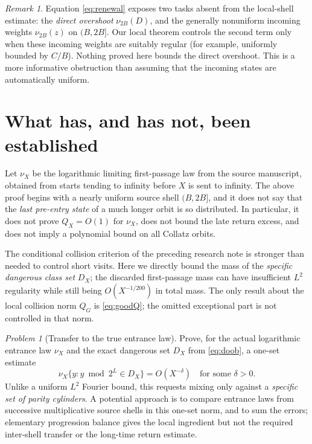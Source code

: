 \documentclass[11pt]{amsart}
\theoremstyle{remark}\newtheorem{remark}{Remark}
\newtheorem{problem}{Problem}
\begin{document}
\begin{remark}
Equation \eqref{eq:renewal} exposes two tasks absent from the local-shell estimate: the \emph{direct overshoot} $\nu_{2B}(D)$, and the generally nonuniform incoming weights $\nu_{2B}(z)$ on $(B,2B]$.  Our local theorem controls the second term only when these incoming weights are suitably regular (for example, uniformly bounded by $C/B$).  Nothing proved here bounds the direct overshoot.  This is a more informative obstruction than assuming that the incoming states are automatically uniform.
\end{remark}

\section{What has, and has not, been established}
Let $\nu_X$ be the logarithmic limiting first-passage law from the source manuscript, obtained from starts tending to infinity before $X$ is sent to infinity.  The above proof begins with a nearly uniform source shell $(B,2B]$, and it does not say that the \emph{last pre-entry state} of a much longer orbit is so distributed.  In particular, it does not prove $Q_X=O(1)$ for $\nu_X$, does not bound the late return excess, and does not imply a polynomial bound on all Collatz orbits.

The conditional collision criterion of the preceding research note is stronger than needed to control short visits.  Here we directly bound the mass of the \emph{specific dangerous class set} $D_X$; the discarded first-passage mass can have insufficient $L^2$ regularity while still being $O(X^{-1/200})$ in total mass.  The only result about the local collision norm $Q_G$ is \eqref{eq:goodQ}; the omitted exceptional part is not controlled in that norm.

\begin{problem}[Transfer to the true entrance law]
Prove, for the actual logarithmic entrance law $\nu_X$ and the exact dangerous set $D_X$ from \eqref{eq:doob}, a one-set estimate
\[
  \boxed{\nu_X\{y:y\bmod2^L\in D_X\}=O(X^{-\delta})}
 \quad\text{for some }\delta>0.
\]
Unlike a uniform $L^2$ Fourier bound, this requests mixing only against a \emph{specific set of parity cylinders}.  A potential approach is to compare entrance laws from successive multiplicative source shells in this one-set norm, and to sum the errors; elementary progression balance gives the local ingredient but not the required inter-shell transfer or the long-time return estimate.
\end{problem}
\end{document}
